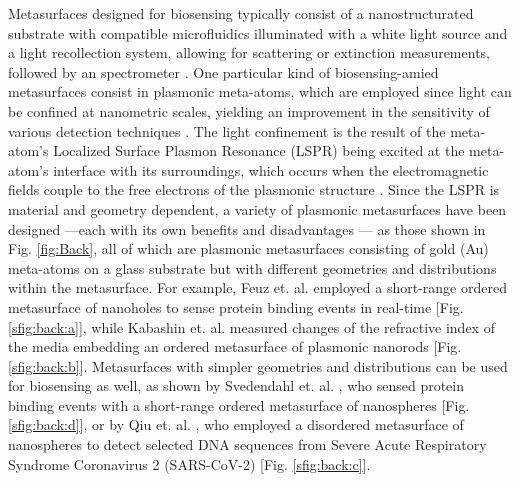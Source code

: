 Metasurfaces designed for biosensing typically consist of a nanostructurated substrate with compatible microfluidics illuminated with a white light source and a light recollection system, allowing for scattering or extinction measurements, followed by an spectrometer \cite{estevez_trends_2014,feuz_improving_2010}. One particular kind of  biosensing-amied metasurfaces consist in plasmonic meta-atoms, which are employed since light can be confined at nanometric scales, yielding an improvement in the sensitivity of various detection techniques \cite{khan_optical_2022}. The light confinement is the result of the meta-atom's Localized Surface Plasmon Resonance (LSPR) being excited at the meta-atom's interface with its surroundings, which occurs when the electromagnetic fields couple to the free electrons of the plasmonic structure \cite{chen_review_2016,kim_plasmonic_2019,estevez_trends_2014}.  Since the LSPR is material and geometry dependent, a variety of plasmonic metasurfaces have been designed \cite{feuz_improving_2010,kabashin_plasmonic_2009,qiu_dual_2020,svedendahl_refractometric_2014} ---each with its own benefits and disadvantages \cite{chen_review_2016,estevez_trends_2014}--- as those shown in  Fig. \ref{fig:Back}, all of which are plasmonic metasurfaces consisting of gold (Au) meta-atoms on a glass substrate but with different geometries and distributions within the metasurface.  For example, Feuz et. al. \cite{feuz_improving_2010} employed a short-range ordered metasurface of nanoholes to sense protein binding events in real-time [Fig. \ref{sfig:back:a}], while  Kabashin et. al. \cite{kabashin_plasmonic_2009} measured  changes of the refractive index of the media embedding an ordered metasurface of plasmonic nanorods [Fig. \ref{sfig:back:b}].  Metasurfaces with simpler geometries and distributions can be used  for biosensing as well, as shown by Svedendahl et. al. \cite{svedendahl_refractometric_2014}, who sensed protein binding events with a short-range ordered metasurface of nanospheres [Fig. \ref{sfig:back:d}], or by  Qiu et. al. \cite{qiu_dual_2020}, who employed a disordered metasurface of nanospheres to detect selected DNA sequences from Severe Acute Respiratory Syndrome Coronavirus 2 (SARS-CoV-2) [Fig. \ref{sfig:back:c}].

